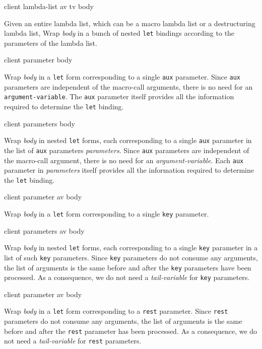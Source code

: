  {client lambda-list av tv body}

Given an entire lambda list, which can be a macro lambda list or a
destructuring lambda list, Wrap \textit{body} in a bunch of nested
\texttt{let} bindings according to the parameters of the lambda list.

 {client parameter body}

Wrap \textit{body} in a \texttt{let} form corresponding to a single
\texttt{aux} parameter.  Since \texttt{aux} parameters are independent
of the macro-call arguments, there is no need for an
\texttt{argument-variable}.  The \texttt{aux} parameter itself
provides all the information required to determine the \texttt{let}
binding.

 {client parameters body}

Wrap \textit{body} in nested \texttt{let} forms, each corresponding to
a single \texttt{aux} parameter in the list of \texttt{aux} parameters
\textit{parameters}.  Since \texttt{aux} parameters are independent of
the macro-call argument, there is no need for an
\textit{argument-variable}.  Each \texttt{aux} parameter in
\textit{parameters} itself provides all the information required to
determine the \texttt{let} binding.

 {client parameter av body}

Wrap \textit{body} in a \texttt{let} form corresponding to a single
\texttt{key} parameter.

 {client parameters av body}

Wrap \textit{body} in nested \texttt{let} forms, each corresponding to
a single \texttt{key} parameter in a list of such \texttt{key}
parameters.  Since \texttt{key} parameters do not consume any
arguments, the list of arguments is the same before and after the
\texttt{key} parameters have been processed.  As a consequence, we do
not need a \textit{tail-variable} for \texttt{key} parameters.

 {client parameter av body}

Wrap \textit{body} in a \texttt{let} form corresponding to a
\texttt{rest} parameter.  Since \texttt{rest} parameters do not
consume any arguments, the list of arguments is the same before and
after the \texttt{rest} parameter has been processed.  As a
consequence, we do not need a \textit{tail-variable} for \texttt{rest}
parameters.

